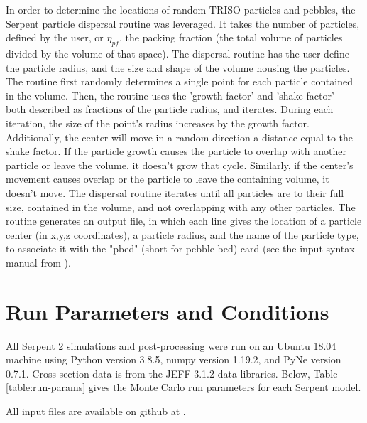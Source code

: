 In order to determine the locations of random TRISO particles and pebbles, the Serpent particle dispersal routine was leveraged.  It takes the number of particles, defined by the user, or $\eta_{pf}$, the packing fraction (the total volume of particles divided by the volume of that space).  The dispersal routine has the user define the particle radius, and the size and shape of the volume housing the particles.  The routine first randomly determines a single point for each particle contained in the volume.  Then, the routine uses the 'growth factor' and 'shake factor' - both described as fractions of the particle radius, and iterates.  During each iteration, the size of the point's radius increases by the growth factor.  Additionally, the center will move in a random direction a distance equal to the shake factor.  If the particle growth causes the particle to overlap with another particle or leave the volume, it doesn't grow that cycle.  Similarly, if the center's movement causes overlap or the particle to leave the containing volume, it doesn't move.  The dispersal routine iterates until all particles are to their full size, contained in the volume, and not overlapping with any other particles.  The routine generates an output file, in which each line gives the location of a particle center (in x,y,z coordinates), a particle radius, and the name of the particle type, to associate it with the "pbed" (short for pebble bed) card (see the input syntax manual from \cite{leppanenjaakko_serpent_2015}).

\section{Run Parameters and Conditions}
\label{sec-run-params}

All Serpent 2 simulations and post-processing were run on an Ubuntu 18.04 machine using Python version 3.8.5, numpy version 1.19.2, and PyNe version 0.7.1.  Cross-section data is from the JEFF 3.1.2 data libraries.  Below, Table \ref{table:run-params} gives the Monte Carlo run parameters for each Serpent model.



All input files are available on github at \cite{richter_zoerichterphlox_2021}.

